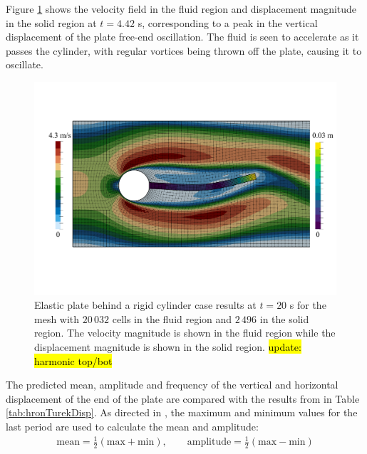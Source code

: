 \documentclass[sn-mathphys,Numbered]{sn-jnl}%
\begin{document}
Figure \ref{fig:hronTurek-results} shows the velocity field in the fluid region and displacement magnitude in the solid region at $t = 4.42$ s, corresponding to a peak in the vertical displacement of the plate free-end oscillation.
The fluid is seen to accelerate as it passes the cylinder, with regular vortices being thrown off the plate, causing it to oscillate.
\begin{figure}[htbp]
   \centering
	   \includegraphics[width=\textwidth]{figures/hronTurek-results} 
   \caption{Elastic plate behind a rigid cylinder case results at $t = 20$ s for the mesh with $20\,032$ cells in the fluid region and $2\,496$ in the solid region. The velocity magnitude is shown in the fluid region while the displacement magnitude is shown in the solid region. \hl{update: harmonic top/bot}}
   \label{fig:hronTurek-results}
\end{figure}
The predicted mean, amplitude and frequency of the vertical and horizontal displacement of the end of the plate are compared with the results from \citet{Turek2006} in Table \ref{tab:hronTurekDisp}.
As directed in \citet{Turek2006}, the maximum and minimum values for the last period are used to calculate the mean and amplitude:
\begin{eqnarray}
	\text{mean} = \frac{1}{2}(\text{max} + \text{min}), \quad\quad
	\text{amplitude} = \frac{1}{2}(\text{max} - \text{min})
\end{eqnarray}
\end{document}
